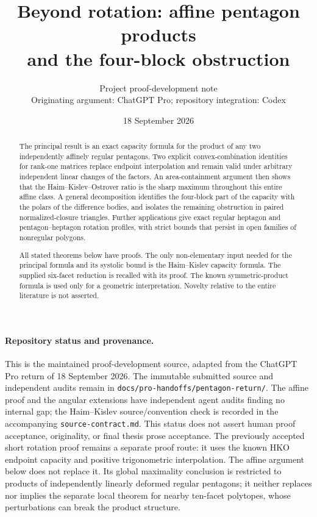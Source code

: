 \documentclass[11pt,a4paper]{article}
\title{Beyond rotation: affine pentagon products\\and the four-block obstruction}
\author{Project proof-development note\\Originating argument: ChatGPT Pro; repository integration: Codex}
\date{18 September 2026}
\theoremstyle{definition}\newtheorem{definition}[theorem]{Definition}
\theoremstyle{remark}\newtheorem{remark}[theorem]{Remark}
\begin{document}
\maketitle
\begin{abstract}
The principal result is an exact capacity formula for the product of any two independently affinely regular pentagons. Two explicit convex-combination identities for rank-one matrices replace endpoint interpolation and remain valid under arbitrary independent linear changes of the factors. An area-containment argument then shows that the Haim--Kislev--Ostrover ratio is the sharp maximum throughout this entire affine class. A general decomposition identifies the four-block part of the capacity with the polars of the difference bodies, and isolates the remaining obstruction in paired normalized-closure triangles. Further applications give exact regular heptagon and pentagon--heptagon rotation profiles, with strict bounds that persist in open families of nonregular polygons.

All stated theorems below have proofs. The only non-elementary input needed for the principal formula and its systolic bound is the Haim--Kislev capacity formula. The supplied six-facet reduction is recalled with its proof. The known symmetric-product formula is used only for a geometric interpretation. Novelty relative to the entire literature is not asserted.
\end{abstract}
\paragraph{Repository status and provenance.}
This is the maintained proof-development source, adapted from the ChatGPT Pro
return of 18 September 2026. The immutable submitted source and independent
audits remain in \texttt{docs/pro-handoffs/pentagon-return/}.
The affine proof and the angular extensions have independent agent audits
finding no internal gap; the Haim--Kislev source/convention check is recorded
in the accompanying \texttt{source-contract.md}. This status does not assert
human proof acceptance, originality, or final thesis prose acceptance.
The previously accepted short rotation proof remains a separate proof route:
it uses the known HKO endpoint capacity and positive trigonometric interpolation.
The affine argument below does not replace it. Its global maximality conclusion
is restricted to products of independently linearly deformed regular pentagons;
it neither replaces nor implies the separate local theorem for nearby ten-facet
polytopes, whose perturbations can break the product structure.
\end{document}
